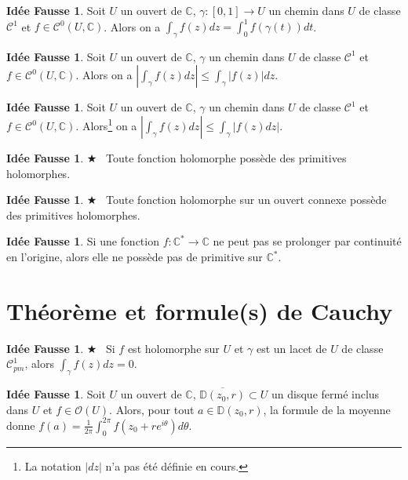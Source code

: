 \documentclass[11pt,a4paper]{article}
\newcommand{\D}{\mathbb{D}}
\newcommand{\C}{\mathbb{C}}
\theoremstyle{definition}
\newtheorem{ideeFausse}[theoreme]{Idée Fausse}
\theoremstyle{plain}
\newcommand{\important}{$\bigstar$~}
\begin{document}
\begin{ideeFausse}
Soit $U$ un ouvert de $\C$, $\gamma : [0,1]\to U$ un chemin dans $U$ de classe $\mathcal C^1$ et $f \in \mathcal C^0(U,\C)$.
Alors on a $\int_\gamma f(z)dz = \int_0^1 f(\gamma(t)) dt $.
\end{ideeFausse}

\begin{ideeFausse}
Soit $U$ un ouvert de $\C$, $\gamma$ un chemin dans $U$ de classe $\mathcal C^1$ et $f \in \mathcal C^0(U,\C)$.
Alors on a $\left|\int_\gamma f(z)dz \right| \leq \int_\gamma \left|f(z)\right|dz $.
\end{ideeFausse}

\begin{ideeFausse}
Soit $U$ un ouvert de $\C$, $\gamma$ un chemin dans $U$ de classe $\mathcal C^1$ et $f \in \mathcal C^0(U,\C)$.
Alors\footnote{La notation $|dz|$ n'a pas été définie en cours.} on a $\left|\int_\gamma f(z)dz \right| \leq \int_\gamma \left|f(z)dz \right|$.
\end{ideeFausse}

\begin{ideeFausse}\important 
Toute fonction holomorphe possède des primitives holomorphes.
\end{ideeFausse}

\begin{ideeFausse}\important 
Toute fonction holomorphe sur un ouvert connexe possède des primitives holomorphes.
\end{ideeFausse}

\begin{ideeFausse}
Si une fonction $f : \C^*\to \C$ ne peut pas se prolonger par continuité en l'origine, alors elle ne possède pas de primitive sur $\C^*$.
\end{ideeFausse}



\section{Théorème et formule(s) de Cauchy}

\begin{ideeFausse}\important 
Si $f$ est holomorphe sur $U$ et $\gamma$ est un lacet de $U$ de classe $\mathcal C^1_{pm}$, alors $\int_\gamma f(z)dz=0$.
\end{ideeFausse}

\begin{ideeFausse}
Soit $U$ un ouvert de $\C$, $\overline{\D(z_0,r)} \subset U$ un disque fermé inclus dans $U$ et $f\in \mathcal O(U)$.
Alors, pour tout $a \in \D(z_0,r)$, la formule de la moyenne donne $f(a) = \frac{1}{2\pi}\int_0^{2\pi} f\left(z_0+re^{i\theta}\right)d\theta$.
\end{ideeFausse}
\end{document}
